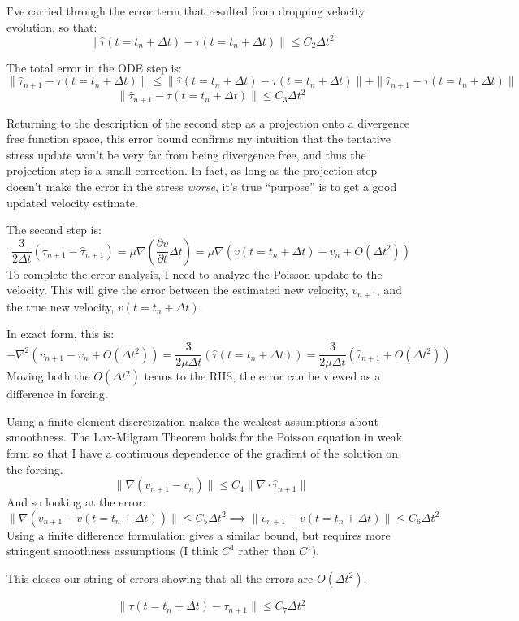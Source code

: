 \documentclass[a4paper]{article}
\begin{document}
I've carried through the error term that resulted from dropping velocity evolution, so that:
\begin{equation}
    \|\hat\tau(t = t_n + \Delta t) - \tau(t = t_n + \Delta t)\| \leq C_2\Delta t^2
    \label{velocityerror}
\end{equation}

The total error in the ODE step is:
\begin{equation}
    \|\hat\tau_{n+1} - \tau(t = t_n + \Delta t)\| \leq \|\hat\tau(t = t_n + \Delta t) - \tau(t = t_n + \Delta t)\| + \|\hat{\tau}_{n+1} - \hat\tau(t = t_n + \Delta t)\|
    \label{velocityerror}
\end{equation}
\begin{equation}
    \|\hat\tau_{n+1} - \tau(t = t_n + \Delta t)\| \leq C_3\Delta t^2
    \label{totalOdeError}
\end{equation}

Returning to the description of the second step as a projection onto a divergence free function space, this
error bound confirms my intuition that the tentative stress update won't be very far from being divergence free,
and thus the projection step is a small correction. In fact, as long as the projection step doesn't make the error in the stress 
\textit{worse}, it's true ``purpose'' is to get a good updated velocity estimate.

The second step is:
\begin{equation}
    \frac{3}{2\Delta t}(\tau_{n+1} - \hat\tau_{n+1}) = \mu\nabla\left(\frac{\partial v}{\partial t}\Delta t\right) = \mu\nabla(v(t = t_n + \Delta t) - v_n + O(\Delta t^2))
    \label{step2}
\end{equation}
To complete the error analysis, I need to analyze the Poisson update to the velocity. 
This will give the error between the estimated new velocity, $v_{n+1}$, and the
true new velocity, $v(t = t_n + \Delta t)$.

In exact form, this is:
\begin{equation}
    -\nabla^2(v_{n+1} - v_n + O(\Delta t^2)) = \frac{3}{2\mu\Delta t}(\hat\tau(t = t_n + \Delta t)) = \frac{3}{2\mu\Delta t}(\hat\tau_{n+1} + O(\Delta t^2))
    \label{exact_poisson}
\end{equation}
Moving both the $O(\Delta t^2)$ terms to the RHS, the error can be viewed as a difference in forcing.

Using a finite element discretization makes the weakest assumptions about smoothness. 
The Lax-Milgram Theorem holds for the Poisson equation in weak form so that I have a continuous
dependence of the gradient of the solution on the forcing.
\begin{equation}
    \|\nabla (v_{n+1} - v_{n})\| \leq C_4\|\nabla \cdot \hat\tau_{n+1}\|
    \label{laxmilgram}
\end{equation}
And so looking at the error:
\begin{equation}
    \|\nabla (v_{n+1} - v(t = t_n + \Delta t))\| \leq C_5\Delta t^2 \implies \|v_{n+1} - v(t = t_n + \Delta t)\| \leq C_6\Delta t^2
    \label{laxmilgram error}
\end{equation}
Using a finite difference formulation gives a similar bound, but requires more stringent
smoothness assumptions (I think $C^4$ rather than $C^1$).

This closes our string of errors showing that all the errors are $O(\Delta t^2)$. 

\begin{equation}
    \|\tau(t = t_n + \Delta t) - \tau_{n+1}\| \leq C_7\Delta t^2
\end{equation}
\end{document}
